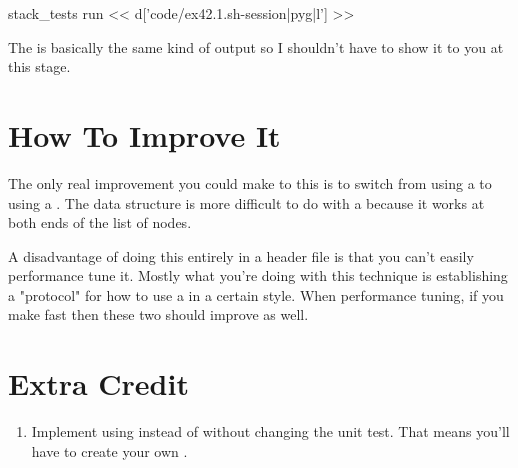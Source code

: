 \begin{code}{stack\_tests run}
<< d['code/ex42.1.sh-session|pyg|l'] >>
\end{code}

The  is basically the same kind of output so I 
shouldn't have to show it to you at this stage.

\section{How To Improve It}

The only real improvement you could make to this is to switch from
using a  to using a .  The 
data structure is more difficult to do with a  because
it works at both ends of the list of nodes.

A disadvantage of doing this entirely in a header file is that you can't
easily performance tune it.  Mostly what you're doing with this technique
is establishing a "protocol" for how to use a  in a certain
style.  When performance tuning, if you make  fast then 
these two should improve as well.

\section{Extra Credit}

\begin{enumerate}
\item Implement  using  instead of 
    without changing the unit test.  That means you'll have to create your
    own .
\end{enumerate}

